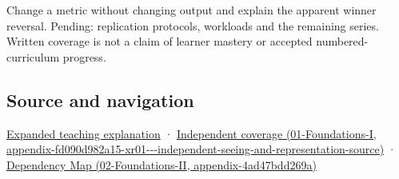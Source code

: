 Change a metric without changing output and explain the apparent winner reversal. Pending: replication protocols, workloads and the remaining series. Written coverage is not a claim of learner mastery or accepted numbered-curriculum progress.

\subsection{Source and navigation}\label{appendix-65788587ef78-source-and-navigation}

\hyperref[04-visual-computing-ii-ch042-make-the-mathematics-operational-without-pretending-to-run-a-human-study]{Expanded teaching explanation} · \href{../01-Foundations-I/main.pdf\#nameddest=appendix-fd090d982a15-xr01---independent-seeing-and-representation-source}{Independent coverage (01-Foundations-I, appendix-fd090d982a15-xr01-\/-\/-independent-seeing-and-representation-source)} · \href{../02-Foundations-II/main.pdf\#nameddest=appendix-4ad47bdd269a}{Dependency Map (02-Foundations-II, appendix-4ad47bdd269a)}
